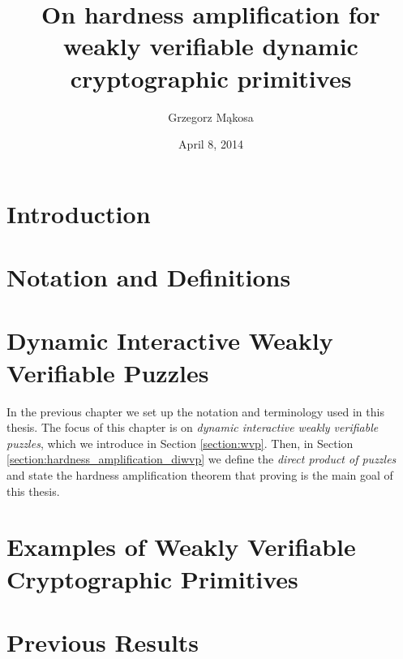 \documentclass[11pt,a4paper,titlepage]{memoir}
\title{On hardness amplification for weakly verifiable dynamic cryptographic primitives}
\author{Grzegorz M\k{a}kosa}
\date{April 8, 2014}
\begin{document}
\frontmatter
%
%

%
\cleartorecto
\tableofcontents
\mainmatter
%
\chapter{Introduction}
\label{ch:introduction}

%
\chapter{Notation and Definitions}
\label{ch:preliminaries}

%
\chapter{Dynamic Interactive Weakly Verifiable Puzzles}
\label{ch:diwvp_main_thm}
In the previous chapter we set up the notation and terminology used in this thesis.
The focus of this chapter is on \textit{dynamic interactive weakly verifiable puzzles}, which we introduce in Section \ref{section:wvp}.
Then, in Section \ref{section:hardness_amplification_diwvp} we define the \textit{direct product of puzzles}
and state the hardness amplification theorem that proving is the main goal of this thesis.
%

%
\chapter{Examples of Weakly Verifiable Cryptographic Primitives}
\label{ch:examples_wvcp}

%
\chapter{Previous Results}
\label{ch:previous_results}

%
\end{document}
